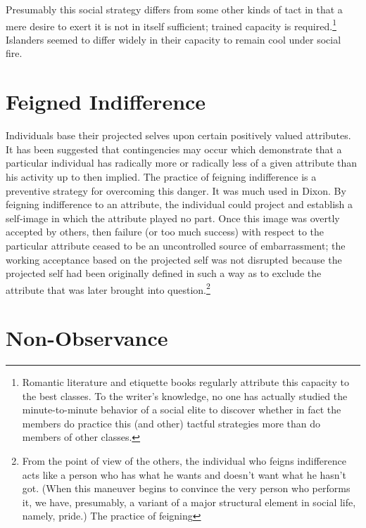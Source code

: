 \documentclass[twoside,symmetric,nobib,justified]{tufte-book}
\begin{document}
\noindent Presumably this social strategy differs from some other kinds of tact in
that a mere desire to exert it is not in itself sufficient; trained
capacity is required.\footnote{Romantic literature and etiquette books
  regularly attribute this capacity to the best classes. To the writer's
  knowledge, no one has actually studied the minute-to-minute behavior
  of a social elite to discover whether in fact the members do practice
  this (and other) tactful strategies more than do members of other
  classes.} Islanders seemed to differ widely in their capacity to
remain cool under social fire.

\hypertarget{feigned-indifference}{%
\section{Feigned Indifference}\label{feigned-indifference}}

Individuals base their projected selves upon certain positively valued
attributes. It has been suggested that contingencies may occur which
demonstrate that a particular individual has radically more or radically
less of a given attribute than his activity up to then implied. The
practice of feigning indifference is a preventive strategy for
overcoming this danger. It was much used in Dixon. By feigning
indifference to an attribute, the individual could project and establish
a self-image in which the attribute played no part. Once this image was
overtly accepted by others, then failure (or too much success) with
respect to the particular attribute ceased to be an uncontrolled source
of embarrassment; the working acceptance based on the projected self was
not disrupted because the projected self had been originally defined in
such a way as to exclude the attribute that was later brought into
question.\footnote{From the point of view of the others, the individual
  who feigns indifference acts like a person who has what he wants and
  doesn't want what he hasn't got. (When this maneuver begins to
  convince the very person who performs it, we have, presumably, a
  variant of a major structural element in social life, namely, pride.)
  The practice of feigning}

\hypertarget{non-observance}{%
\section{Non-Observance}\label{non-observance}}
\end{document}
